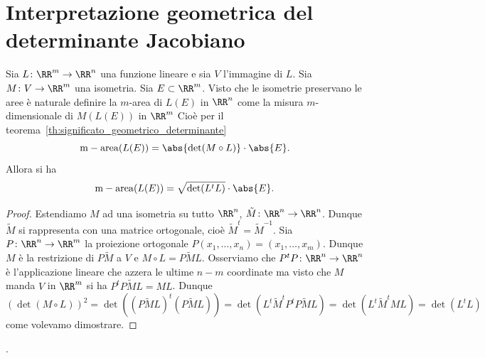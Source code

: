 \section{Interpretazione geometrica del determinante Jacobiano}

\begin{theorem}
  \label{th:significato_geometrico_jacobiano}
  Sia $L\colon \RR^m \to \RR^n$ una funzione lineare
  e sia $V$ l'immagine di $L$.
  Sia $M\colon V \to \RR^m$ una isometria.
  Sia $E\subset \RR^m$.
  Visto che le isometrie preservano le aree
  è naturale definire la $m$-area di $L(E)$ in $\RR^n$ 
  come la misura $m$-dimensionale di $M(L(E))$ in $\RR^m$
  Cioè per il teorema~\ref{th:significato_geometrico_determinante}
  \[
    \mathrm{m-area}(L(E)) = \abs{\det (M\circ L)}\cdot \abs{E}.
  \]
  Allora si ha 
  \[
    \mathrm{m-area}(L(E)) = \sqrt{\det (L^t L)}\cdot \abs{E}.
  \]
\end{theorem}
%
\begin{proof}
Estendiamo $M$ ad una isometria su tutto $\RR^n$, $\tilde M\colon \RR^n \to \RR^n$.
Dunque $\tilde M$ si rappresenta con una matrice ortogonale, cioè $\tilde M^t = \tilde M^{-1}$.
Sia $P\colon \RR^n \to \RR^m$ la proiezione ortogonale $P(x_1,\dots,x_n) = (x_1,\dots,x_m)$.
Dunque $M$ è la restrizione di $P\tilde M$ a $V$
e $M\circ L = P\tilde M L$.
Osserviamo che $P^t P\colon \RR^n\to \RR^n$ è l'applicazione 
lineare che azzera le ultime $n-m$ coordinate
ma visto che $M$ manda $V$ in $\RR^m$ si ha $P^t P \tilde ML = ML$. 
Dunque 
\[
 (\det(M\circ L))^2 
 = \det((P \tilde M L)^t (P \tilde M L)) 
 = \det(L^t \tilde M^t P^t P \tilde M L) 
 = \det(L^t \tilde M^t M L) = \det(L^t L)
\]
come volevamo dimostrare.
\end{proof}.


